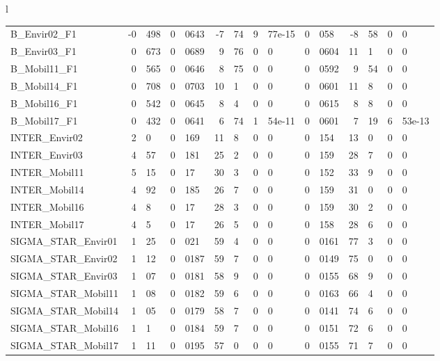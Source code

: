 \documentclass[12pt,a4paper]{article}
\begin{document}
\begin{sidewaystable}[htb]
\begin{tabular}{l}
\begin{tabular}{lr@{.}lr@{.}lr@{.}lr@{.}lr@{.}lr@{.}lr@{.}l}
\hline
B\_Envir02\_F1               &  -0&498 &   0&0643 &   -7&74 & 9&77e-15 &         0&058 &        -8&58 &           0&0 \\
B\_Envir03\_F1               &   0&673 &   0&0689 &    9&76 &      0&0 &        0&0604 &         11&1 &           0&0 \\
B\_Mobil11\_F1               &   0&565 &   0&0646 &    8&75 &      0&0 &        0&0592 &         9&54 &           0&0 \\
B\_Mobil14\_F1               &   0&708 &   0&0703 &    10&1 &      0&0 &        0&0601 &         11&8 &           0&0 \\
B\_Mobil16\_F1               &   0&542 &   0&0645 &     8&4 &      0&0 &        0&0615 &          8&8 &           0&0 \\
B\_Mobil17\_F1               &   0&432 &   0&0641 &    6&74 & 1&54e-11 &        0&0601 &         7&19 &      6&53e-13 \\
INTER\_Envir02              &     2&0 &    0&169 &    11&8 &      0&0 &         0&154 &         13&0 &           0&0 \\
INTER\_Envir03              &    4&57 &    0&181 &    25&2 &      0&0 &         0&159 &         28&7 &           0&0 \\
INTER\_Mobil11              &    5&15 &     0&17 &    30&3 &      0&0 &         0&152 &         33&9 &           0&0 \\
INTER\_Mobil14              &    4&92 &    0&185 &    26&7 &      0&0 &         0&159 &         31&0 &           0&0 \\
INTER\_Mobil16              &     4&8 &     0&17 &    28&3 &      0&0 &         0&159 &         30&2 &           0&0 \\
INTER\_Mobil17              &     4&5 &     0&17 &    26&5 &      0&0 &         0&158 &         28&6 &           0&0 \\
SIGMA\_STAR\_Envir01         &    1&25 &    0&021 &    59&4 &      0&0 &        0&0161 &         77&3 &           0&0 \\
SIGMA\_STAR\_Envir02         &    1&12 &   0&0187 &    59&7 &      0&0 &        0&0149 &         75&0 &           0&0 \\
SIGMA\_STAR\_Envir03         &    1&07 &   0&0181 &    58&9 &      0&0 &        0&0155 &         68&9 &           0&0 \\
SIGMA\_STAR\_Mobil11         &    1&08 &   0&0182 &    59&6 &      0&0 &        0&0163 &         66&4 &           0&0 \\
SIGMA\_STAR\_Mobil14         &    1&05 &   0&0179 &    58&7 &      0&0 &        0&0141 &         74&6 &           0&0 \\
SIGMA\_STAR\_Mobil16         &     1&1 &   0&0184 &    59&7 &      0&0 &        0&0151 &         72&6 &           0&0 \\
SIGMA\_STAR\_Mobil17         &    1&11 &   0&0195 &    57&0 &      0&0 &        0&0155 &         71&7 &           0&0 \\
\hline
\end{tabular}
  \end{tabular}
\end{sidewaystable}
\end{document}
